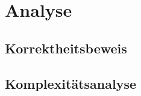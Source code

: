 \section{Analyse} \label{analyse}

\subsection{Korrektheitsbeweis}

\subsection{Komplexitätsanalyse}